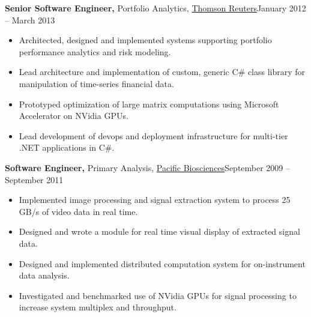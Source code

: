 \documentclass{article}
\begin{document}
{\bf Senior Software Engineer,} Portfolio Analytics, \href{https://www.thomsonreuters.com}{Thomson Reuters}\hfill January 2012 -- March 2013
\begin{itemize} \itemsep -2pt
    
    \item Architected, designed and implemented systems supporting portfolio performance analytics and risk modeling.
    
    \item Lead architecture and implementation of custom, generic C\# class library for manipulation of time-series financial data.
    
    \item Prototyped optimization of large matrix computations using Microsoft Accelerator on NVidia GPUs.
    
    \item Lead development of devops and deployment infrastructure for multi-tier .NET applications in C#.
    
\end{itemize}

{\bf Software Engineer,} Primary Analysis, \href{http://www.pacb.com/}{Pacific Biosciences}\hfill September 2009 -- September 2011
\begin{itemize} \itemsep -2pt
    
	\item Implemented image processing and signal extraction system to process 25 GB/s of video data in real time.
    
    \item Designed and wrote a module for real time visual display of extracted signal data.
    
	\item Designed and implemented distributed computation system for on-instrument data analysis.
	
	\item Investigated and benchmarked use of NVidia GPUs for signal processing to increase system multiplex and throughput.
    
\end{itemize}
\end{document}
